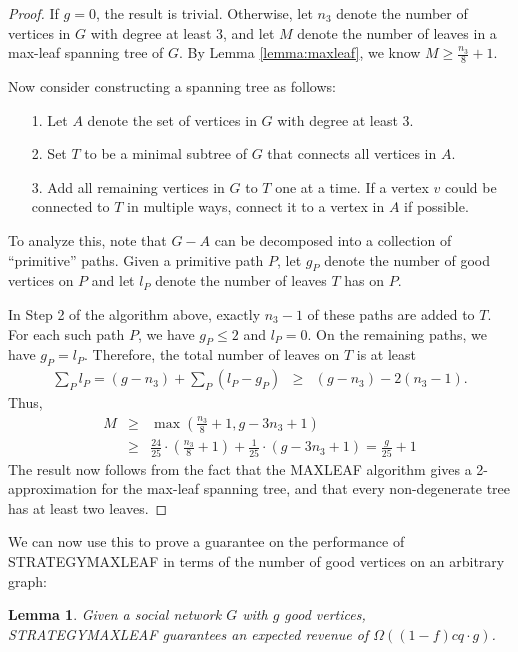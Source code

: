 \documentclass[letterpaper,twoside]{article}
\newtheorem{lemma}{Lemma}
\newcommand{\maxleaf}{\textrm{M{\scriptsize AX}\-L{\scriptsize EAF}}}
\newcommand{\strategyml}{\textrm{S{\scriptsize TRATEGY}\-M{\scriptsize AX}\-L{\scriptsize EAF}}}
\begin{document}
\begin{proof}
  If $g = 0$, the result is trivial. Otherwise, let $n_3$ denote the
  number of vertices in $G$ with degree at least 3, and let $M$
  denote the number of leaves in a max-leaf spanning tree of $G$. By
  Lemma \ref{lemma:maxleaf}, we know $M \ge \frac{n_3}{8} + 1$.

  Now consider constructing a spanning tree as follows:
  \begin{itemize}
    \item[1.] Let $A$ denote the set of vertices in $G$ with degree at
    least 3.
    \item[2.] Set $T$ to be a minimal subtree of $G$ that connects
    all vertices in $A$.
    \item[3.] Add all remaining vertices in $G$ to $T$ one at a time. If
    a vertex $v$ could be connected to $T$ in multiple ways, connect
    it to a vertex in $A$ if possible.
  \end{itemize}
  To analyze this, note that $G - A$ can be decomposed into a
  collection of ``primitive'' paths. Given a primitive path $P$, let
  $g_P$ denote the number of good vertices on $P$ and let $l_P$
  denote the number of leaves $T$ has on $P$.

  In Step 2 of the algorithm above, exactly $n_3 - 1$ of these paths
  are added to $T$. For each such path $P$, we have $g_P \le 2$ and
  $l_P = 0$. On the remaining paths, we have $g_P = l_P$. Therefore,
  the total number of leaves on $T$ is at least
  \begin{eqnarray*}
  \sum_P l_P = (g - n_3) + \sum_P (l_P - g_P) &\ge& (g - n_3) - 2(n_3 - 1).
  \end{eqnarray*}
  Thus,
  \begin{eqnarray*}
    M &\ge& \max\left(\frac{n_3}{8} + 1, g - 3n_3 + 1\right)\\
      &\ge& \frac{24}{25} \cdot \left(\frac{n_3}{8} + 1\right) + \frac{1}{25} \cdot (g - 3n_3 + 1) = \frac{g}{25} + 1
  \end{eqnarray*}
  The result now follows from the
  fact that the \maxleaf{} algorithm gives a 2-approximation for the
  max-leaf spanning tree, and that every non-degenerate tree has at least
  two leaves.
\end{proof}

We can now use this to prove a guarantee on the performance of
\strategyml{} in terms of the number of good vertices on an arbitrary graph:
\begin{lemma} \label{lem:strategybound}
Given a social network $G$ with $g$ good vertices, \strategyml{}
guarantees an expected revenue of $\Omega((1-f)cq \cdot g)$.
\end{lemma}
\end{document}
